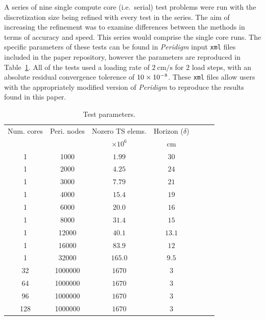 \documentclass[preprint,12pt]{elsarticle}
\begin{document}
A series of nine single compute core (i.e.\ serial) test problems were run with the discretization size being refined with every test in the series. The aim of increasing the refinement was to examine differences between the methods in terms of accuracy and speed. This series would comprise the single core runs.   The specific parameters of these tests can be found in \emph{Peridigm} input {\tt xml} files included in the paper repository, however the parameters are reproduced in Table~\ref{tab:TestParams}. All of the tests used a loading rate of $\SI{2}{\centi\meter\per\second}$ for $\num{2}$ load steps, with an absolute residual convergence tolerence of $\num{10E-8}$. These {\tt xml} files allow users with the appropriately modified version of \emph{Peridigm} to reproduce the results found in this paper.
%
\begin{table}[!tbp]    
  \scriptsize
  \centering
  \caption{Test parameters.} \label{tab:TestParams}   
       \begin{tabular}{c c c c c c c}
         \toprule
				 Num. cores &Peri. nodes & Nozero TS elems. & Horizon ($\delta$)  \\ 
         &            & $\times 10^6$    & \si{\centi\meter}   \\
        \midrule
        1 & 1000 & $1.99$             & $30$    \\
        1 & 2000 & $4.25$             & $24$   \\
        1 & 3000 & $7.79$             & $21$   \\
        1 & 4000 & $15.4$             & $19$   \\
        1 & 6000 & $20.0$             & $16$   \\
        1 & 8000 & $31.4$             & $15$   \\
        1 & 12000 & $40.1$            & $13.1$ \\
        1 & 16000 & $83.9$            & $12$   \\
        1 & 32000 & $165.0$           & $9.5$  \\
        32 & 1000000 & $1670$          & $3$   \\
        64 & 1000000 & $1670$          & $3$   \\
        96 & 1000000 & $1670$          & $3$   \\
        128 & 1000000 & $1670$          & $3$  \\
        \bottomrule
    \end{tabular}
\end{table}
\end{document}

